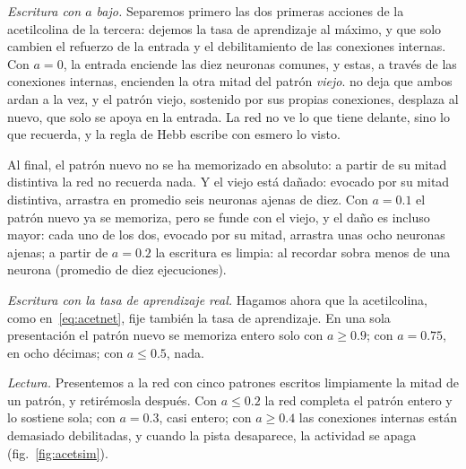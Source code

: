 \emph{Escritura con $a$ bajo.} Separemos primero las dos primeras acciones de la acetilcolina de la tercera: dejemos la tasa de aprendizaje al máximo, y que solo cambien el refuerzo de la entrada y el debilitamiento de las conexiones internas. Con $a=0$, la entrada enciende las diez neuronas comunes, y estas, a través de las conexiones internas, encienden la otra mitad del patrón \emph{viejo}.  no deja que ambos ardan a la vez, y el patrón viejo, sostenido por sus propias conexiones, desplaza al nuevo, que solo se apoya en la entrada. La red no ve lo que tiene delante, sino lo que recuerda, y la regla de Hebb escribe con esmero lo visto.

Al final, el patrón nuevo no se ha memorizado en absoluto: a partir de su mitad distintiva la red no recuerda nada. Y el viejo está dañado: evocado por su mitad distintiva, arrastra en promedio seis neuronas ajenas de diez. Con $a=0.1$ el patrón nuevo ya se memoriza, pero se funde con el viejo, y el daño es incluso mayor: cada uno de los dos, evocado por su mitad, arrastra unas ocho neuronas ajenas; a partir de $a=0.2$ la escritura es limpia: al recordar sobra menos de una neurona (promedio de diez ejecuciones).

\emph{Escritura con la tasa de aprendizaje real.} Hagamos ahora que la acetilcolina, como en~\eqref{eq:acetnet}, fije también la tasa de aprendizaje. En una sola presentación el patrón nuevo se memoriza entero solo con $a\ge0.9$; con $a=0.75$, en ocho décimas; con $a\le0.5$, nada.

\emph{Lectura.} Presentemos a la red con cinco patrones escritos limpiamente la mitad de un patrón, y retirémosla después. Con $a\le0.2$ la red completa el patrón entero y lo sostiene sola; con $a=0.3$, casi entero; con $a\ge0.4$ las conexiones internas están demasiado debilitadas, y cuando la pista desaparece, la actividad se apaga (fig.~\ref{fig:acetsim}).


